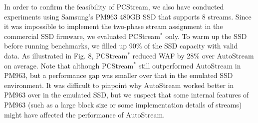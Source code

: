 In order to confirm the feasibility of \textsf{\small PCStream}, we also have
conducted experiments using Samsung's PM963 480GB SSD that supports 8 streams.
Since it was impossible to implement the two-phase stream assignment in the
commercial SSD firmware, we evaluated \textsf{\small PCStream$^*$} only.  To warm up the
SSD before running benchmarks, we filled up 90\% of the SSD capacity with valid
data.
As illustrated in Fig. 8, \textsf{\small PCStream$^*$} reduced WAF by
28\% over \textsf{\small AutoStream} on average.  
Note that although \textsf{\small PCStream$^*$} still outperformed \textsf{\small AutoStream} in PM963, 
but a performance gap was smaller over that
in the emulated SSD environment.  It was difficult to pinpoint why
\textsf{\small AutoStream} worked better in PM963 over in the emulated SSD, but we
suspect that some internal features of PM963 (such as a large block size or some implementation details of streams) %
might have affected the performance of \textsf{\small AutoStream}.

